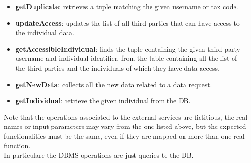 \begin{itemize}
\begin{itemize}
\item \textbf{getDuplicate}: retrieves a tuple matching the given username or tax code.
\item \textbf{updateAccess}: updates the list of all third parties that can have access to the individual data.
\item \textbf{getAccessibleIndividual}: finds the tuple containing the given third party username and individual identifier, from the table containing all the list of the third parties and the individuals of which they have data access.
\item \textbf{getNewData}: collects all the new data related to a data request.
\item \textbf{getIndividual}: retrieve the given individual from the DB.
\end{itemize}
\end{itemize}
Note that the operations associated to the external services are fictitious, the real names or input parameters may vary from the one listed above, but the expected functionalities must be the same, even if they are mapped on more than one real function.\\
In particulare the DBMS operations are just queries to the DB.

